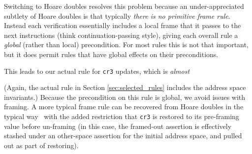 Switching to Hoare doubles resolves this problem because an under-appreciated subtlety of Hoare doubles 
is that typically \emph{there is no primitive frame rule}. 
Instead each verification essentially includes a local frame that it passes to the next instructions
(think continuation-passing style), giving each overall rule a \emph{global} (rather than local) precondition.
For most rules this is not that important, but it does permit rules that have global effects on their preconditions.

This leads to our actual rule for \lstinline|cr3| updates, which is \emph{almost}
\begin{mathpar}
\end{mathpar}
(Again, the actual rule in Section \ref{sec:selected_rules} includes the address space invariants.)
Because the precondition on this rule is global, we avoid issues with framing. 
A more typical frame rule can be recovered from Hoare doubles in the typical way~\cite{Chlipala2013Bedrock} 
with the added restriction that \lstinline|cr3| is restored to its pre-framing value before un-framing (in this case, the framed-out assertion is effectively
stashed under an other-space assertion for the initial address space, and pulled out as part of restoring).





